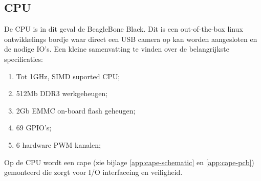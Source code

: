 \subsection{CPU}

De CPU is in dit geval de BeagleBone Black. Dit is een out-of-the-box linux ontwikkelings
bordje waar direct een USB camera op kan worden aangesloten en de nodige IO's.
Een kleine samenvatting te vinden over de belangrijkste specificaties:

\begin{enumerate}
    \item Tot 1GHz, SIMD suported CPU;
    \item 512Mb DDR3 werkgeheugen;
    \item 2Gb EMMC on-board flash geheugen;
    \item 69 GPIO's;
    \item 6 hardware PWM kanalen;
\end{enumerate}

Op de CPU wordt een cape (zie bijlage \ref{app:cape-schematic} en
\ref{app:cape-pcb})  gemonteerd die zorgt voor I/O interfaceing en veiligheid.
